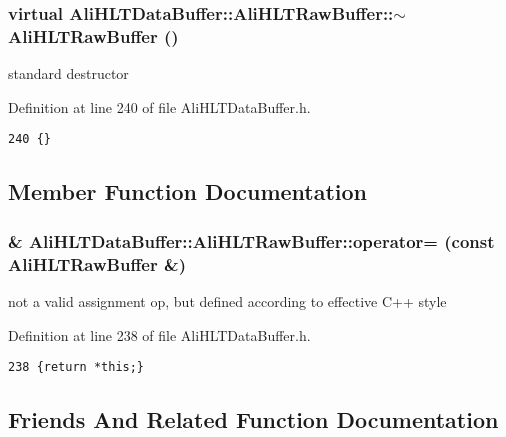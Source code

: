 \subsubsection{\setlength{\rightskip}{0pt plus 5cm}virtual Ali\-HLTData\-Buffer::Ali\-HLTRaw\-Buffer::$\sim${\bf Ali\-HLTRaw\-Buffer} ()\hspace{0.3cm}{\tt  [inline, virtual]}}\label{classAliHLTDataBuffer_1_1AliHLTRawBuffer_a3}


standard destructor 

Definition at line 240 of file Ali\-HLTData\-Buffer.h.

\footnotesize\begin{verbatim}240 {}
\end{verbatim}\normalsize 




\subsection{Member Function Documentation}
\subsubsection{\& Ali\-HLTData\-Buffer::Ali\-HLTRaw\-Buffer::operator= (const {\bf Ali\-HLTRaw\-Buffer} \&)\hspace{0.3cm}{\tt  [inline]}}\label{classAliHLTDataBuffer_1_1AliHLTRawBuffer_a2}


not a valid assignment op, but defined according to effective C++ style 

Definition at line 238 of file Ali\-HLTData\-Buffer.h.

\footnotesize\begin{verbatim}238 {return *this;}
\end{verbatim}\normalsize 




\subsection{Friends And Related Function Documentation}
